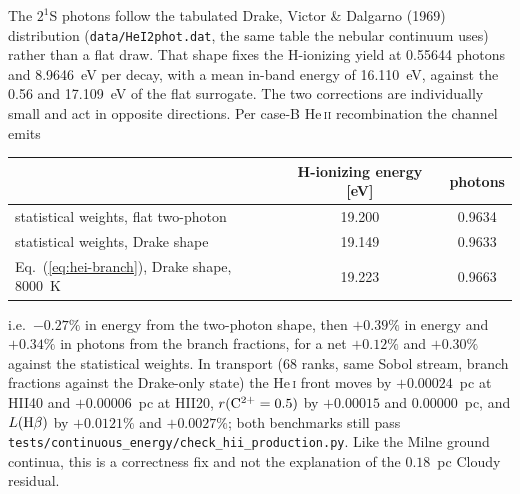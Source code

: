 \documentclass[english,a4paper]{my_memo}
\newcommand{\code}[1]{\texttt{#1}}
\begin{document}
The $2^1$S photons follow the tabulated Drake, Victor \& Dalgarno (1969)
distribution (\code{data/HeI2phot.dat}, the same table the nebular continuum
uses) rather than a flat draw.  That shape fixes the H-ionizing yield at
0.55644 photons and 8.9646~eV per decay, with a mean in-band energy of
16.110~eV, against the 0.56 and 17.109~eV of the flat surrogate.  The two
corrections are individually small and act in opposite directions.  Per
case-B He\,\textsc{ii} recombination the channel emits
\begin{center}
\begin{tabular}{lcc}
\toprule
 & H-ionizing energy [eV] & photons \\
\midrule
statistical weights, flat two-photon & 19.200 & 0.9634 \\
statistical weights, Drake shape     & 19.149 & 0.9633 \\
Eq.~(\ref{eq:hei-branch}), Drake shape, 8000~K & 19.223 & 0.9663 \\
\bottomrule
\end{tabular}
\end{center}
i.e.\ $-0.27\%$ in energy from the two-photon shape, then $+0.39\%$ in
energy and $+0.34\%$ in photons from the branch fractions, for a net
$+0.12\%$ and $+0.30\%$ against the statistical weights.  In transport (68
ranks, same Sobol stream, branch fractions against the Drake-only state) the
He\,\textsc{i} front moves by $+0.00024$~pc at HII40 and $+0.00006$~pc at
HII20, $r({\rm C^{2+}}=0.5)$ by $+0.00015$ and $0.00000$~pc, and
$L({\rm H}\beta)$ by $+0.0121\%$ and $+0.0027\%$; both benchmarks still pass
\code{tests/continuous\_energy/check\_hii\_production.py}.  Like the Milne
ground continua, this is a correctness fix and not the explanation of the
$0.18$~pc Cloudy residual.
\end{document}
